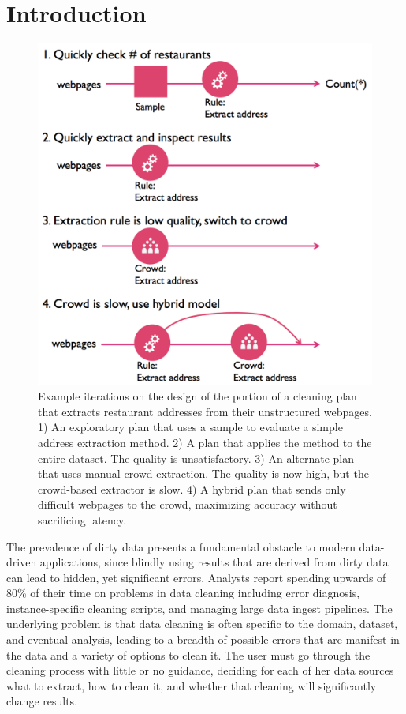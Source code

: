 \section{Introduction}\label{sec:intro}

\begin{figure}[t]
\centering
\vspace{-0.5cm}
\includegraphics[width = .4\textwidth]{figs/lifecycle.png}
\vspace{-0.2cm}
\caption{Example iterations on the design of the portion of a cleaning plan that extracts restaurant addresses from their unstructured webpages.  
1) An exploratory plan that uses a sample to evaluate a simple address extraction method.
2) A plan that applies the method to the entire dataset. The quality is unsatisfactory. 
3) An alternate plan that uses manual crowd extraction. The quality is now high, but the crowd-based extractor is slow. 
4) A hybrid plan that sends only difficult webpages to the crowd, maximizing accuracy without sacrificing latency.}
\label{fig:ex-plan}
\vspace{-0.6cm}
\end{figure}

%
%
The prevalence of dirty data presents a fundamental obstacle to modern data-driven applications, since 
blindly using results that are derived from dirty data can lead to hidden, yet significant errors.
Analysts report spending upwards of 80\% of their time on problems in data cleaning \cite{kandel2012} including 
error diagnosis, instance-specific cleaning scripts, and managing large data ingest pipelines.
The underlying problem is that data cleaning is often specific to the domain, dataset, and eventual analysis,
leading to a breadth of possible errors that are manifest in the data and a variety of options to clean it.
The user must go through the cleaning process with little or no guidance, deciding for each of her data sources what to extract, how to clean it, and whether that cleaning will significantly change results.

